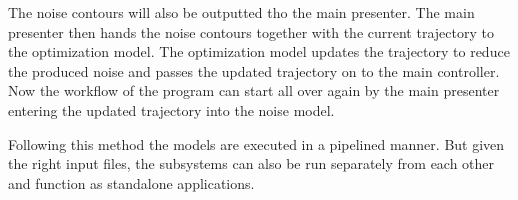 The noise contours will also be outputted tho the main presenter. The main presenter then hands the noise contours together with the current trajectory to the optimization model. The optimization model updates the trajectory to reduce the produced noise and passes the updated trajectory on to the main controller. Now the workflow of the program can start all over again by the main presenter entering the updated trajectory into the noise model.

Following this method the models are executed in a pipelined manner. But given the right input files, the subsystems can also be run separately from each other and function as standalone applications.

